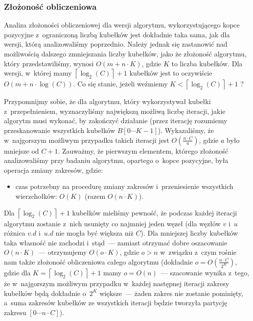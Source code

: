 \subsubsection{Złożoność obliczeniowa}

Analiza złożoności obliczeniowej dla wersji algorytmu, wykorzystującego kopce pozycyjne z~ograniczoną liczbą kubełków jest dokładnie taka sama, jak dla wersji, którą analizowaliśmy poprzednio. Należy jednak się zastanowić nad możliwością dalszego zmniejszania liczby kubełków, jako że złożoność algorytmu, który przedstawiliśmy, wynosi $ O \left( m + n \cdot K \right)$, gdzie $K$ to liczba kubełków. Dla wersji, w~której mamy $ \left \lceil \log_{2} \left( C \right) \right \rceil + 1$ kubełków jest to oczywiście $ O \left( m + n \cdot \log \left( C \right) \right)$. Co się stanie, jeżeli weźmiemy $K < \left \lceil \log_{2} \left( C \right) \right \rceil + 1$ ?

Przypomnijmy sobie, że dla algorytmu, który wykorzystywał kubełki z~przepełnieniem, wyznaczyliśmy największą możliwą liczbę iteracji, jakie algorytm musi wykonać, by zakończyć działanie (przez iterację rozumiemy przeskanowanie wszystkich kubełków $B \left[ 0 \cdots K - 1\right]$). Wykazaliśmy, że w~najgorszym możliwym przypadku takich iteracji jest $ O \left( \frac{n \cdot C}{a} \right)$, gdzie $a$ było mniejsze od $C + 1$. Zauważmy, że pierwszym elementem, którego złożoność analizowaliśmy przy badaniu algorytmu, opartego o~kopce pozycyjne, była operacja zmiany zakresów, gdzie:

\begin{itemize}
\item czas potrzebny na procedurę zmiany zakresów i~przeniesienie wszystkich wierzchołków: $ O \left( K \right)$ (razem $ O \left( n \cdot K \right)$).
\end{itemize}

Dla $ \left \lceil \log_{2} \left( C \right) \right \rceil + 1$ kubełków mieliśmy pewność, że podczas każdej iteracji algorytmu zostanie z~nich usunięty co najmniej jeden węzeł (dla węzłów $v$ i~$u$ różnica $v.d$ i~$u.d$ nie mogła być większa niż $C$). Dla mniejszej liczby kubełków taka własność nie zachodzi i~stąd~--- zamiast otrzymać dobre oszacowanie $ O \left( n \cdot K \right)$~--- otrzymujemy $ O \left( o \cdot K \right)$, gdzie $o > n $ w~związku z~czym rośnie nam także złożoność obliczeniowa całego algorytmu (dokładnie $o = O \left( \frac{n \cdot C}{2^{K}}\right)$, gdzie dla $K = \left \lceil \log_{2} \left( C \right) \right \rceil + 1$ mamy $o = O \left( n \right)$~--- szacowanie wynika z~tego, że w~najgorszym możliwym przypadku w~każdej następnej iteracji zakresy kubełków będą dokładnie o~$2^{K}$ większe~--- żaden zakres nie zostanie pominięty, a~suma zakresów kubełków ze wszystkich iteracji będzie tworzyła partycję zakresu $\left[ 0 \cdots n \cdot C \right]$).
